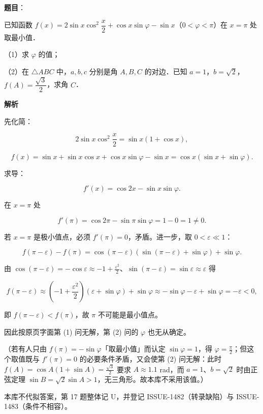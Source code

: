 \begin{answer}

\textbf{题目}：

已知函数 $f(x)=2\sin x\cos^2\dfrac x2+\cos x\sin\varphi-\sin x$（$0<\varphi<\pi$）在 $x=\pi$ 处取最小值．

（1）求 $\varphi$ 的值；

（2）在 $\triangle ABC$ 中，$a,b,c$ 分别是角 $A,B,C$ 的对边．已知 $a=1$，$b=\sqrt2$，$f(A)=\dfrac{\sqrt3}{2}$，求角 $C$．

\textbf{解析}

先化简：

\nopagebreak[4]
\[2\sin x\cos^2\frac x2=\sin x(1+\cos x),\]

\nopagebreak[4]
\[f(x)=\sin x+\sin x\cos x+\cos x\sin\varphi-\sin x=\cos x(\sin x+\sin\varphi).\]

求导：

\nopagebreak[4]
\[f'(x)=\cos2x-\sin x\sin\varphi .\]

在 $x=\pi$ 处

\nopagebreak[4]
\[f'(\pi)=\cos2\pi-\sin\pi\sin\varphi=1-0=1\neq0 .\]

若 $x=\pi$ 是极小值点，必须 $f'(\pi)=0$，矛盾。进一步，取 $0<\varepsilon\ll1$：

\nopagebreak[4]
\[f(\pi-\varepsilon)-f(\pi)=\cos(\pi-\varepsilon)(\sin(\pi-\varepsilon)+\sin\varphi)+\sin\varphi .\]

由 $\cos(\pi-\varepsilon)=-\cos\varepsilon\approx-1+\frac{\varepsilon^2}{2}$、$\sin(\pi-\varepsilon)=\sin\varepsilon\approx\varepsilon$ 得

\nopagebreak[4]
\[f(\pi-\varepsilon)\approx\left(-1+\frac{\varepsilon^2}{2}\right)(\varepsilon+\sin\varphi)+\sin\varphi\approx-\sin\varphi-\varepsilon+\sin\varphi=-\varepsilon<0,\]

即 $f(\pi-\varepsilon)<f(\pi)$，故 $\pi$ 不可能是最小值点。

因此按原页字面第 (1) 问无解，第 (2) 问的 $\varphi$ 也无从确定。

（若有人只由 $f(\pi)=-\sin\varphi$「取最小值」而认定 $\sin\varphi=1$，得 $\varphi=\frac\pi2$；但这个取值既与 $f'(\pi)=0$ 的必要条件矛盾，又会使第 (2) 问无解：此时 $f(A)=\cos A(1+\sin A)=\frac{\sqrt3}{2}$ 要求 $A\approx1.1$ rad，而 $a=1$、$b=\sqrt2$ 时由正弦定理 $\sin B=\sqrt2\sin A>1$，无三角形。故本库不采用该值。）

本库不代拟答案，第 17 题整体记 U，并登记 ISSUE-1482（转录缺陷）与 ISSUE-1483（条件不相容）。


\end{answer}
